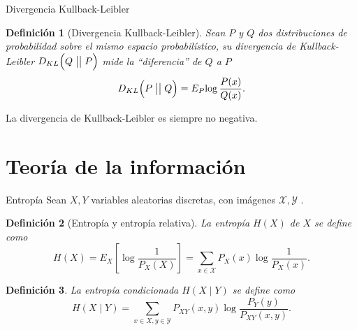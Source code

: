 \documentclass[aspectratio=169]{beamer}
\newcommand\KL[2]{D_{KL}\Big(#1 \bigm|\bigm| #2\Big)}
\newcommand{\X}{\mathcal{X}}
\newtheorem{defi}{Definición}
\begin{document}
    \begin{frame}{Divergencia Kullback-Leibler}
      \begin{defi}[Divergencia Kullback-Leibler]
    Sean \(P\) y \(Q\) dos distribuciones de probabilidad sobre el mismo espacio probabilístico, su \emph{divergencia de Kullback-Leibler} \(\KL{Q}{P}\) mide la ``diferencia'' de \(Q\) a \(P\)
    \[
      \KL{P}{Q} = E_P{\log \frac{P(x)}{Q(x)}}.
    \]
      \end{defi}
      La divergencia de Kullback-Leibler es siempre no negativa.
 
  \end{frame}

  
  \section{Teoría de la información}

  \begin{frame}{Entropía}
    Sean \(X,Y\) variables aleatorias discretas, con imágenes \(\X, \mathcal Y\) .


    \begin{defi}[Entropía y entropía relativa]
    
    
      La entropía \(H(X)\) de \(X\) se define como
      \[
        H(X) = E_X\left[\log\frac{1}{P_X(X)}\right] =  \sum_{x \in \X} P_X(x) \log\frac{1}{P_X(x)}.
      \]
    \end{defi}
    \begin{defi}
      La entropía  condicionada \(H(X\mid Y)\) se define como
      \[
        H(X\mid Y) = \sum_{x \in X,y \in \mathcal Y}P_{XY}(x,y)\log\frac{P_Y(y)}{P_{XY}(x,y)}.
      \]
      
      
    \end{defi}

  \end{frame}
\end{document}
